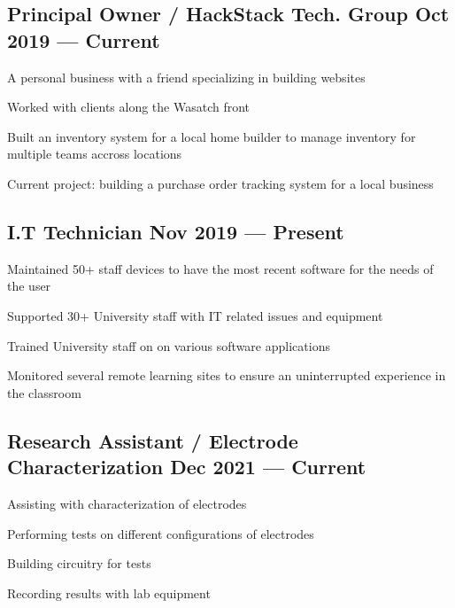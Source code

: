 \documentclass[letter,10pt]{article}
\begin{document}
\subsection{{Principal Owner / HackStack Tech. Group \hfill Oct 2019 --- Current}}
\begin{zitemize}
\item A personal business with a friend specializing in building websites
\item Worked with clients along the Wasatch front
\item Built an inventory system for a local home builder to manage inventory for multiple teams accross locations
\item Current project: building a purchase order tracking system for a local business
\end{zitemize}

\subsection{{I.T Technician \hfill Nov 2019 --- Present}}
\begin{zitemize}
\item Maintained 50+ staff devices to have the most recent software for the needs of the user
\item Supported 30+ University staff with IT  related issues and equipment
\item Trained University staff on on various software applications
\item Monitored several remote learning sites to ensure an uninterrupted experience in the classroom
\end{zitemize}



\subsection{{Research Assistant / Electrode Characterization \hfill Dec 2021 --- Current}}
\begin{zitemize}
\item Assisting with characterization of electrodes
\item Performing tests on different configurations of electrodes
\item Building circuitry for tests
\item Recording results with lab equipment
\end{zitemize}
\end{document}

